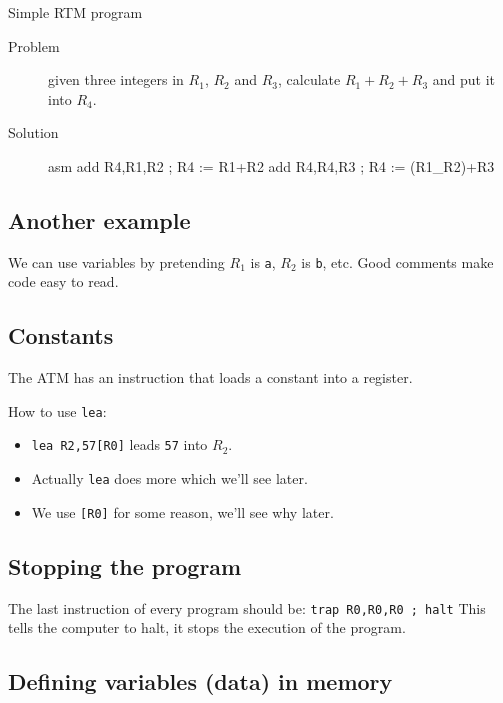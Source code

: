 \begin{highlight}{Simple RTM program}
	\begin{description}
		\item[Problem] given three integers in \(R_1\), \(R_2\) and \(R_3\), calculate  \(R_1+R_2+R_3\) and put it into \(R_4\).
		\item[Solution]

			\begin{code}{asm}
				add R4,R1,R2 ; R4 := R1+R2
				add R4,R4,R3 ; R4 := (R1_R2)+R3
			\end{code}
	\end{description}
\end{highlight}

\subsection{Another example}\label{sub:another_example}

We can use variables by pretending \(R_1\) is  \texttt{a}, \(R_2\) is \texttt{b}, etc.
Good comments make code easy to read.

\subsection{Constants}\label{sub:constants}

The ATM has an instruction that loads a constant into a register.

How to use \texttt{lea}:
\begin{itemize}
	\item \texttt{lea R2,57[R0]} leads \texttt{57} into \(R_2\).
	\item Actually \texttt{lea} does more which we'll see later.
	\item We use \texttt{[R0]} for some reason, we'll see why later.
\end{itemize}

\subsection{Stopping the program}\label{sub:stopping_the_program}

The last instruction of every program should be: \texttt{trap R0,R0,R0 ; halt}
This tells the computer to halt, it stops the execution of the program.

\subsection{Defining variables (data) in memory}\label{sub:defining_variables_data_in_memory}

